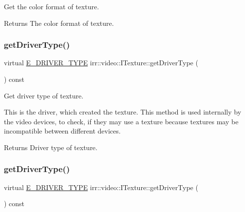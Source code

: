 Get the color format of texture. 

\begin{DoxyReturn}{Returns}
The color format of texture. 
\end{DoxyReturn}
\mbox{\label{classirr_1_1video_1_1ITexture_a4c6abdc0c789e6022e4e1b8a06cfab71}} 
\subsubsection{\texorpdfstring{get\+Driver\+Type()}{getDriverType()}\hspace{0.1cm}{\footnotesize\ttfamily [1/2]}}
{\footnotesize\ttfamily virtual \hyperlink{namespaceirr_1_1video_ae35a6de6d436c76107ad157fe42356d0}{E\+\_\+\+D\+R\+I\+V\+E\+R\+\_\+\+T\+Y\+PE} irr\+::video\+::\+I\+Texture\+::get\+Driver\+Type (\begin{DoxyParamCaption}{ }\end{DoxyParamCaption}) const\hspace{0.3cm}{\ttfamily [pure virtual]}}



Get driver type of texture. 

This is the driver, which created the texture. This method is used internally by the video devices, to check, if they may use a texture because textures may be incompatible between different devices. \begin{DoxyReturn}{Returns}
Driver type of texture. 
\end{DoxyReturn}
\mbox{\label{classirr_1_1video_1_1ITexture_a4c6abdc0c789e6022e4e1b8a06cfab71}} 
\subsubsection{\texorpdfstring{get\+Driver\+Type()}{getDriverType()}\hspace{0.1cm}{\footnotesize\ttfamily [2/2]}}
{\footnotesize\ttfamily virtual \hyperlink{namespaceirr_1_1video_ae35a6de6d436c76107ad157fe42356d0}{E\+\_\+\+D\+R\+I\+V\+E\+R\+\_\+\+T\+Y\+PE} irr\+::video\+::\+I\+Texture\+::get\+Driver\+Type (\begin{DoxyParamCaption}{ }\end{DoxyParamCaption}) const\hspace{0.3cm}{\ttfamily [pure virtual]}}



